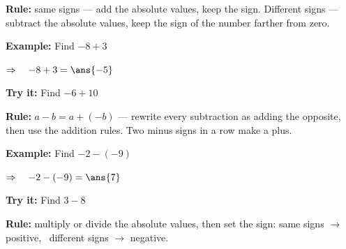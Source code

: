 \documentclass[12pt]{article}
\begin{document}


\begin{formulabox}
\textbf{Rule:} same signs --- add the absolute values, keep the sign.
Different signs --- subtract the absolute values, keep the sign of the number
farther from zero.
\end{formulabox}

\begin{examplebox}
\textbf{Example:} \quad Find $-8 + 3$

$\Rightarrow\quad -8 + 3 = \ans{-5}$
\end{examplebox}

\begin{tryitbox}
\textbf{Try it:} \quad Find $-6 + 10$\\[2pt]
\end{tryitbox}


\begin{formulabox}
\textbf{Rule:} \quad $a - b = a + (-b)$ \quad --- rewrite every subtraction as adding
the opposite, then use the addition rules. Two minus signs in a row make a plus.
\end{formulabox}

\begin{examplebox}
\textbf{Example:} \quad Find $-2 - (-9)$

$\Rightarrow\quad -2 - (-9) = \ans{7}$
\end{examplebox}

\begin{tryitbox}
\textbf{Try it:} \quad Find $3 - 8$\\[2pt]
\end{tryitbox}


\begin{formulabox}
\textbf{Rule:} multiply or divide the absolute values, then set the sign:
same signs $\rightarrow$ positive, \ different signs $\rightarrow$ negative.
\end{formulabox}
\end{document}
